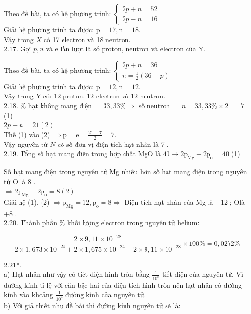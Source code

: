 \documentclass[10pt]{article}
\begin{document}
Theo đề bài, ta có hệ phương trình: $\left\{\begin{array}{l}2 p+n=52 \\ 2 p-n=16\end{array}\right.$\\
Giải hệ phương trình ta được: $\mathrm{p}=17, \mathrm{n}=18$.\\
Vậy trong $X$ có 17 electron và 18 neutron.\\
2.17. Gọi $p, n$ và e lần lượt là số proton, neutron và electron của Y.

Theo đề bài, ta có hệ phương trình: $\left\{\begin{array}{l}2 p+n=36 \\ n=\frac{1}{2}(36-p)\end{array}\right.$\\
Giải hệ phương trình ta được: $\mathrm{p}=12, \mathrm{n}=12$.\\
Vậy trong Y có: 12 proton, 12 electron và 12 neutron.\\
2.18. \% hạt không mang điện $=33,33 \% \Rightarrow$ số neutron $=n=33,33 \% \times 21=7$ (1)\\
$2 p+n=21(2)$\\
Thế (1) vào (2) $\Rightarrow \mathrm{p}=\mathrm{e}=\frac{21-7}{2}=7$.\\
Vậy nguyên tử $N$ có số đơn vị điện tích hạt nhân là 7 .\\
2.19. Tổng số hạt mang điện trong hợp chất MgO là $40 \rightarrow 2 \mathrm{p}_{\mathrm{Mg}}+2 \mathrm{p}_{\mathrm{o}}=40$ (1)

Số hạt mang điện trong nguyên tử Mg nhiều hơn số hạt mang điện trong nguyên tử O là 8 .\\
$\Rightarrow 2 \mathrm{p}_{\mathrm{Mg}}-2 \mathrm{p}_{\mathrm{o}}=8(2)$\\
Giải hệ (1), (2) $\Rightarrow \mathrm{p}_{\mathrm{Mg}}=12, \mathrm{p}_{\mathrm{o}}=8 \Rightarrow$ Điện tích hạt nhân của Mg là +12 ; Olà +8 .\\
2.20. Thành phần \% khối lượng electron trong nguyên tử helium:

$$
\frac{2 \times 9,11 \times 10^{-28}}{2 \times 1,673 \times 10^{-24}+2 \times 1,675 \times 10^{-24}+2 \times 9,11 \times 10^{-28}} \times 100 \%=0,0272 \%
$$

2.21*.\\
a) Hạt nhân như vậy có tiết diện hình tròn bằng $\frac{1}{10^{8}}$ tiết diện của nguyên tử. Vì đường kính tỉ lệ với căn bậc hai của diện tích hình tròn nên hạt nhân có đường kính vào khoảng $\frac{1}{10^{4}}$ đường kính của nguyên tử.\\
b) Với giả thiết như đề bài thì đường kính nguyên tử sẽ là:
\end{document}

